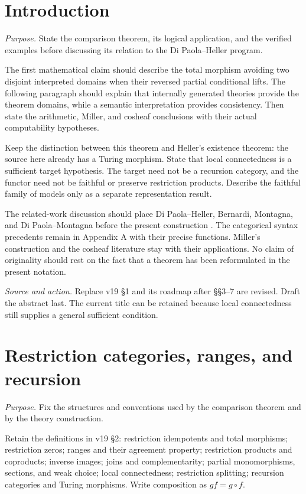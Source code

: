 \documentclass[11pt]{article}
\theoremstyle{definition}\newtheorem{definition}[theorem]{Definition}
\newcommand{\source}[1]{\par\smallskip\noindent\textit{Source and action.} #1\par\smallskip}
\newcommand{\purpose}[1]{\noindent\textit{Purpose.} #1\par\medskip}
\begin{document}
\section{Introduction}
\purpose{State the comparison theorem, its logical application, and the verified examples before discussing its relation to the Di Paola--Heller program.}
The first mathematical claim should describe the total morphism avoiding
two disjoint interpreted domains when their reversed partial conditional
lifts. The following paragraph should explain that internally generated
theories provide the theorem domains, while a semantic interpretation
provides consistency. Then state the arithmetic, Miller, and cosheaf
conclusions with their actual computability hypotheses.

Keep the distinction between this theorem and Heller's existence theorem:
the source here already has a Turing morphism. State that local
connectedness is a sufficient target hypothesis. The target need not be
a recursion category, and the functor need not be faithful or preserve
restriction products. Describe the faithful family of models only as a
separate representation result.

The related-work discussion should place Di Paola--Heller, Bernardi,
Montagna, and Di Paola--Montagna before the present construction
\cite{DPH,Bernardi,Montagna,DPM}. The categorical syntax precedents remain
in Appendix A with their precise functions. Miller's construction and the
cosheaf literature stay with their applications. No claim of originality
should rest on the fact that a theorem has been reformulated in the
present notation.
\source{Replace v19 \S1 and its roadmap after \S\S3--7 are revised. Draft the abstract last. The current title can be retained because local connectedness still supplies a general sufficient condition.}

\section{Restriction categories, ranges, and recursion}
\purpose{Fix the structures and conventions used by the comparison theorem and by the theory construction.}
Retain the definitions in v19 \S2: restriction idempotents and total
morphisms; restriction zeros; ranges and their agreement property;
restriction products and coproducts; inverse images; joins and
complementarity; partial monomorphisms, sections, and weak choice;
local connectedness; restriction splitting; recursion categories and
Turing morphisms. Write composition as $gf=g\circ f$.
\end{document}
